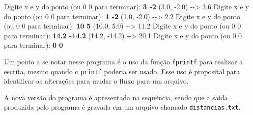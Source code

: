 \documentclass[
  11pt,
  a4paper,
]{scrbook}
\newenvironment{Shaded}{\begin{snugshade}}{\end{snugshade}}
\newcommand{\KeywordTok}[1]{\textcolor[rgb]{0.13,0.29,0.53}{\textbf{#1}}}
\newcommand{\NormalTok}[1]{#1}
\begin{document}
\begin{Shaded}
\begin{Highlighting}[]
\NormalTok{Digite x e y do ponto (ou 0 0  para terminar): }\KeywordTok{ 3 {-}2 }
\NormalTok{(3.0, {-}2.0) {-}{-}\textgreater{} 3.6}
\NormalTok{Digite x e y do ponto (ou 0 0  para terminar): }\KeywordTok{ 1 {-}2 }
\NormalTok{(1.0, {-}2.0) {-}{-}\textgreater{} 2.2}
\NormalTok{Digite x e y do ponto (ou 0 0  para terminar): }\KeywordTok{ 10 5 }
\NormalTok{(10.0, 5.0) {-}{-}\textgreater{} 11.2}
\NormalTok{Digite x e y do ponto (ou 0 0  para terminar): }\KeywordTok{ 14.2 {-}14.2 }
\NormalTok{(14.2, {-}14.2) {-}{-}\textgreater{} 20.1}
\NormalTok{Digite x e y do ponto (ou 0 0  para terminar): }\KeywordTok{ 0 0 }
\end{Highlighting}
\end{Shaded}

Um ponto a se notar nesse programa é o uso da função \texttt{fprintf}
para realizar a escrita, mesmo quando o \texttt{printf} poderia ser
usado. Esse uso é proposital para identificar as alterações para mudar o
fluxo para um arquivo.

A nova versão do programa é apresentada na sequência, sendo que a saída
produzida pelo programa é gravada em um arquivo chamado
\texttt{distancias.txt}.
\end{document}
